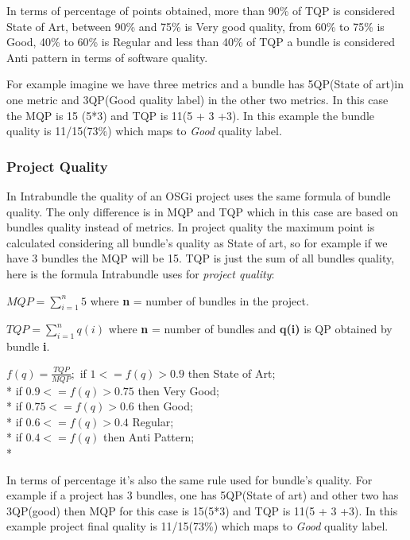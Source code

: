In terms of percentage of points obtained, more than 90\% of TQP is considered State of Art, between 90\% and 75\% is Very good quality, from 60\% to 75\% is Good, 40\% to 60\% is Regular and less than 40\% of TQP a bundle is considered Anti pattern in terms of software quality. 

For example imagine we have three metrics and a bundle has 5QP(State of art)in one metric and 3QP(Good quality label) in the other two metrics. In this case the MQP is 15 (5*3) and TQP is 11(5 + 3 +3). In this example the bundle quality is 11/15(73\%) which maps to \emph{Good} quality label. 


\subsubsection{Project Quality}
\label{sec:project-quality}
In Intrabundle the quality of an OSGi project uses the same formula of bundle quality. The only difference is in MQP and TQP which in this case are based on bundles quality instead of metrics. In project quality the maximum point is calculated considering all bundle's quality as State of art, so for example if we have 3 bundles the MQP will be 15. TQP is just the sum of all bundles quality, here is the formula Intrabundle uses for \emph{project quality}:

\(MQP = \sum_{i=1}^{n} 5 \) where \textbf{n} = number of bundles in the project. \newline

\(TQP = \sum_{i=1}^{n} q(i) \) where \textbf{n} = number of bundles and \textbf{q(i)} is QP obtained by bundle \textbf{i}. \newline

 
\(
f(q) = \frac{TQP}{MQP};
\)
\newline
\newline
 if \( 1 <= f(q) > 0.9 \) then State of Art; \\*
 if \( 0.9 <= f(q) > 0.75 \) then Very Good; \\*
 if \( 0.75 <= f(q) > 0.6 \) then Good; \\*
 if \( 0.6 <= f(q) > 0.4 \) Regular; \\*
 if \( 0.4 <= f(q) \) then Anti Pattern;\\*

In terms of percentage it's also the same rule used for bundle's quality. For example if a project has 3 bundles, one has 5QP(State of art) and other two has 3QP(good) then MQP for this case is 15(5*3) and TQP is 11(5 + 3 +3). In this example project final quality is 11/15(73\%) which maps to \emph{Good} quality label. 

